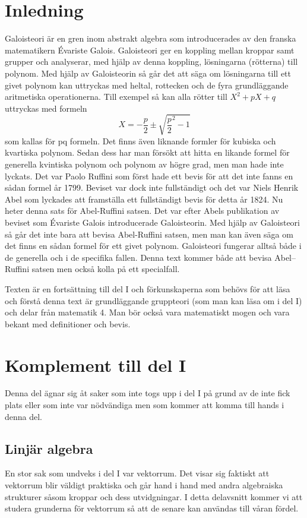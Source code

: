 \documentclass{article}
\theoremstyle{definition}
\begin{document}
\section{Inledning}
Galoisteori är en gren inom abstrakt algebra som introducerades av den franska matematikern Évariste Galois. Galoisteori 
ger en koppling mellan kroppar samt grupper och analyserar, med hjälp av denna koppling, lösningarna (rötterna) till polynom.
Med hjälp av Galoisteorin så går det att säga om lösningarna till ett givet polynom kan uttryckas med heltal, rottecken och 
de fyra grundläggande aritmetiska operationerna. Till exempel så kan alla rötter till 
$X^2 + pX + q$ uttryckas med formeln 
\[X = -\frac{p}{2} \pm \sqrt{ \frac{p}{2}^2 - 1 }\]
som kallas för pq formeln. 
Det finns även liknande formler för kubiska och kvartiska polynom. Sedan dess har man försökt att hitta en likande formel för 
generella kvintiska polynom och polynom av högre grad, men man hade inte lyckats. 
Det var Paolo Ruffini som först hade ett bevis för att det inte fanns en sådan formel år 1799. 
Beviset var dock inte fullständigt och det var Niels Henrik Abel som lyckades att framställa ett fullständigt bevis 
för detta år 1824. Nu heter denna sats för Abel-Ruffini satsen. Det var efter Abels publikation av beviset som Évariste Galois introducerade 
Galoisteorin. Med hjälp av Galoisteori så går det inte bara att bevisa Abel-Ruffini satsen, men man kan även 
säga om det finns en sådan formel för ett givet polynom. Galoisteori fungerar alltså både i de generella och i de specifika fallen. Denna 
text kommer både att bevisa Abel–Ruffini satsen men också kolla på ett specialfall. 

Texten är en fortsättning till del I och förkunskaperna som behövs för att läsa och förstå denna text 
är grundläggande gruppteori (som man kan läsa om i del I) och delar från matematik 4.
Man bör också vara matematiskt mogen och vara bekant med definitioner och bevis. 

\section{Komplement till del I}
Denna del ägnar sig åt saker som inte togs upp i del I på grund av de inte fick plats eller som inte var nödvändiga men som kommer att komma 
till hands i denna del.

\subsection{Linjär algebra}
En stor sak som undveks i del I var vektorrum. Det visar sig faktiskt att vektorrum blir väldigt praktiska och går hand i hand med andra 
algebraiska strukturer såsom kroppar och dess utvidgningar. I detta delavsnitt kommer vi att studera grunderna för vektorrum så att de senare kan användas till 
våran fördel.
\end{document}
